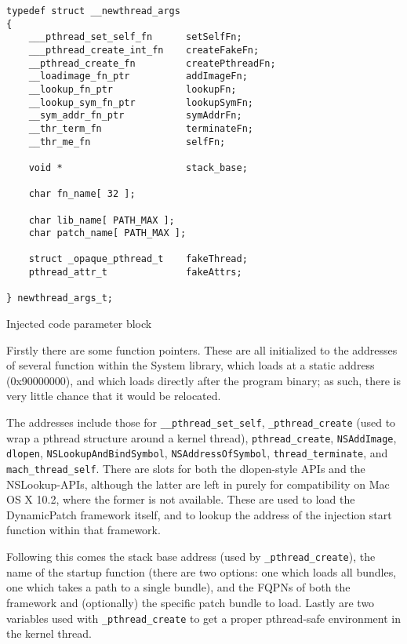 \documentclass[english]{article}
\begin{document}
\begin{sourcecode}
\begin{verbatim}
typedef struct __newthread_args
{
    ___pthread_set_self_fn      setSelfFn;
    ___pthread_create_int_fn    createFakeFn;
    __pthread_create_fn         createPthreadFn;
    __loadimage_fn_ptr          addImageFn;
    __lookup_fn_ptr             lookupFn;
    __lookup_sym_fn_ptr         lookupSymFn;
    __sym_addr_fn_ptr           symAddrFn;
    __thr_term_fn               terminateFn;
    __thr_me_fn                 selfFn;

    void *                      stack_base;

    char fn_name[ 32 ];

    char lib_name[ PATH_MAX ];
    char patch_name[ PATH_MAX ];

    struct _opaque_pthread_t    fakeThread;
    pthread_attr_t              fakeAttrs;

} newthread_args_t;
\end{verbatim}
\caption{Injected code parameter block}
\label{newthreadArgs}
\end{sourcecode}

Firstly there are some function pointers. These are all initialized to the addresses of several function within the System library, which loads at a static address (0x90000000), and which loads directly after the program binary; as such, there is very little chance that it would be relocated.

The addresses include those for \texttt{\_\_pthread\_set\_self}, \texttt{\_pthread\_create} (used to wrap a pthread structure around a kernel thread), \texttt{pthread\_create}, \texttt{NSAddImage}, \texttt{dlopen}, \texttt{NSLookupAndBindSymbol}, \texttt{NSAddressOfSymbol}, \texttt{thread\_terminate}, and \texttt{mach\_thread\_self}. There are slots for both the dlopen-style APIs and the NSLookup-APIs, although the latter are left in purely for compatibility on Mac OS X 10.2, where the former is not available. These are used to load the DynamicPatch framework itself, and to lookup the address of the injection start function within that framework.

Following this comes the stack base address (used by \texttt{\_pthread\_create}), the name of the startup function (there are two options: one which loads all bundles, one which takes a path to a single bundle), and the FQPNs of both the framework and (optionally) the specific patch bundle to load. Lastly are two variables used with \texttt{\_pthread\_create} to get a proper pthread-safe environment in the kernel thread.
\end{document}
